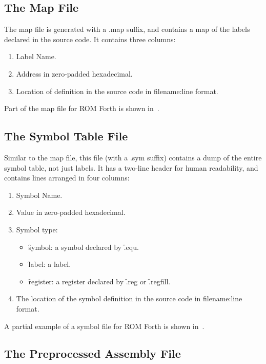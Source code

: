 \subsection{The Map File}

The map file is generated with a {\ttfamily .map} suffix, and contains a map of the
labels declared in the source code. It contains three columns:

\begin{enumerate}
\item Label Name.
\item Address in zero-padded hexadecimal.
\item Location of definition in the source code in {\ttfamily filename:line} format.
\end{enumerate}

Part of the map file for ROM Forth is shown in~.

\subsection{The Symbol Table File}

Similar to the map file, this file (with a {\ttfamily .sym} suffix) contains a dump
of the entire symbol table, not just labels. It has a two-line header for human
readability, and contains lines arranged in four columns:

\begin{enumerate}
\item Symbol Name.
\item Value in zero-padded hexadecimal.
\item Symbol type:
  \begin{itemize}
  \item \f{symbol}: a symbol declared by \f{.equ}.
  \item \f{label}: a label.
  \item \f{register}: a register declared by \f{.reg} or \f{.regfill}.
  \end{itemize}
  \item The location of the symbol definition in the source code in {\ttfamily filename:line} format.
\end{enumerate}

A partial example of a symbol file for ROM Forth is shown in~.

\subsection{The Preprocessed Assembly File}

